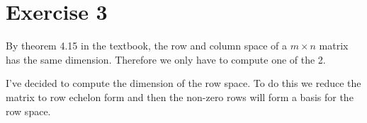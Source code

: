 \section{Exercise 3}

By theorem 4.15 in the textbook, the row and column space of a $m\times n$ matrix has the same dimension. Therefore we only have to compute one of the 2.

I've decided to compute the dimension of the row space. To do this we reduce the matrix to row echelon form and then the non-zero rows will form a basis for the row space.

